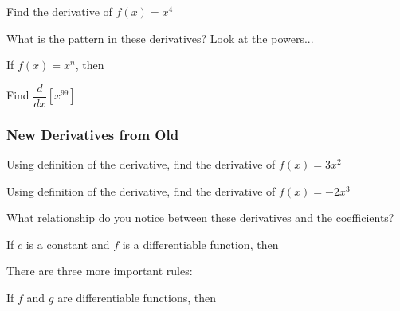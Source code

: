 \documentclass[notes]{subfiles}
\begin{document}
		\begin{ex}
			Find the derivative of $f(x) = x^4$
		\end{ex}	
			\newpage
			
		\begin{question}
			What is the pattern in these derivatives? Look at the powers...
		\end{question}
			
		\begin{thm}
			If $f(x) = x^n$, then 
		\end{thm}
			
		\begin{ex}
			Find $\dfrac{d}{dx}[x^{99}]$
		\end{ex}

	\subsubsection*{New Derivatives from Old}
		\begin{ex}
			Using definition of the derivative, find the derivative of $f(x) = 3x^2$
		\end{ex}
			\newpage
			
		\begin{ex}
			Using definition of the derivative, find the derivative of $f(x) = -2x^3$
		\end{ex}
		\begin{question}
			What relationship do you notice between these derivatives and the coefficients?
		\end{question}
			
		\begin{thm}
			If $c$ is a constant and $f$ is a differentiable function, then
		\end{thm}
			
		There are three more important rules:
		\begin{thm}
			If $f$ and $g$ are differentiable functions, then 
		\end{thm}
			
\end{document}
